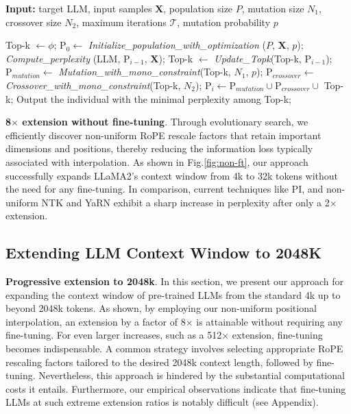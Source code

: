 \begin{algorithm}[t]
	\small
	\caption{The search algorithm}
	\textbf{Input:} target LLM, input samples $\mathbf{X}$, population size $P$, mutation size $N_1$, crossover size $N_2$, maximum iterations $\mathcal{T}$, mutation probability $p$\\

	\begin{algorithmic}[1]
		\label{alg:search}
		\STATE Top-k $\gets \phi$;	
		\STATE $\text{P}_0 \gets$ \textit{Initialize\_population\_with\_optimization} ($P$, $\mathbf{X}$, $p$); 
		\STATE \textit{Compute\_perplexity} (LLM, $\text{P}_{i-1}$, $\mathbf{X}$);
		\STATE Top-k $\gets$ \textit{Update\_Topk}(Top-k, $\text{P}_{i-1}$);
		\STATE $\text{P}_{mutation} \gets$ \textit{Mutation\_with\_mono\_constraint}(Top-k, $N_1$, $p$); 
		\STATE $\text{P}_{crossover} \gets$ \textit{Crossover\_with\_mono\_constraint}(Top-k, $N_2$);
		\STATE $\text{P}_i \gets \text{P}_{mutation} \cup \text{P}_{crossover} \cup$ Top-k;
		\ENDFOR
		\STATE Output the individual with the minimal perplexity among Top-k;
	\end{algorithmic}
\end{algorithm}

\textbf{8$\times$ extension without fine-tuning}. Through evolutionary search, we efficiently discover non-uniform RoPE rescale factors that retain important dimensions and positions, thereby reducing the information loss typically associated with interpolation. As shown in Fig.\ref{fig:non-ft}, our approach successfully expands LLaMA2's context window from 4k to 32k tokens without the need for any fine-tuning. In comparison, current techniques like PI, and non-uniform NTK and YaRN exhibit a sharp increase in perplexity after only a 2$\times$ extension.

\subsection{Extending LLM Context Window to 2048K}
\label{sec:extendto2048k}

\textbf{Progressive extension to 2048k}. In this section, we present our approach for expanding the context window of pre-trained LLMs from the standard 4k up to beyond 2048k tokens. As shown, by employing our non-uniform positional interpolation, an extension by a factor of 8$\times$ is attainable without requiring any fine-tuning. For even larger increases, such as a 512$\times$ extension, fine-tuning becomes indispensable. A common strategy involves selecting appropriate RoPE rescaling factors tailored to the desired 2048k context length, followed by fine-tuning. Nevertheless, this approach is hindered by the substantial computational costs it entails. Furthermore, our empirical observations indicate that fine-tuning LLMs at such extreme extension ratios is notably difficult (see Appendix).

